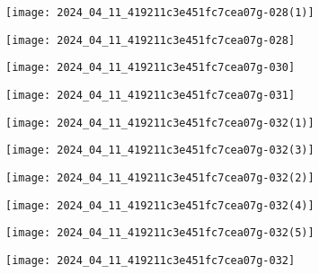 \begin{center}
\texttt{[image: 2024\_04\_11\_419211c3e451fc7cea07g-028(1)]}
\end{center}
\begin{center}
\texttt{[image: 2024\_04\_11\_419211c3e451fc7cea07g-028]}
\end{center}
\begin{center}
\texttt{[image: 2024\_04\_11\_419211c3e451fc7cea07g-030]}
\end{center}
\begin{center}
\texttt{[image: 2024\_04\_11\_419211c3e451fc7cea07g-031]}
\end{center}
\begin{center}
\texttt{[image: 2024\_04\_11\_419211c3e451fc7cea07g-032(1)]}
\end{center}
\begin{center}
\texttt{[image: 2024\_04\_11\_419211c3e451fc7cea07g-032(3)]}
\end{center}
\begin{center}
\texttt{[image: 2024\_04\_11\_419211c3e451fc7cea07g-032(2)]}
\end{center}
\begin{center}
\texttt{[image: 2024\_04\_11\_419211c3e451fc7cea07g-032(4)]}
\end{center}
\begin{center}
\texttt{[image: 2024\_04\_11\_419211c3e451fc7cea07g-032(5)]}
\end{center}
\begin{center}
\texttt{[image: 2024\_04\_11\_419211c3e451fc7cea07g-032]}
\end{center}
